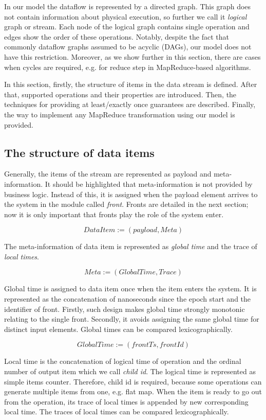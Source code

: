 
\label {fs-model-section}
In our model the dataflow is represented by a directed graph. This graph does not contain information about physical execution, so further we call it {\it logical} graph or stream. Each node of the logical graph contains single operation and edges show the order of these operations. Notably, despite the fact that commonly dataflow graphs assumed to be acyclic (DAGs), our model does not have this restriction. Moreover, as we show further in this section, there are cases when cycles are required, e.g. for reduce step in MapReduce-based algorithms. 

In this section, firstly, the structure of items in the data stream is defined. After that, supported operations and their properties are introduced. Then, the techniques for providing at least/exactly once guarantees are described. Finally, the way to implement any MapReduce transformation using our model is provided.

\subsection{The structure of data items}
Generally, the items of the stream are represented as payload and meta-information. It should be highlighted that meta-information is not provided by business logic. Instead of this, it is assigned when the payload element arrives to the system in the module called {\it front}. Fronts are detailed in the next section; now it is only important that fronts play the role of the system enter. 

\[DataItem := (payload, Meta)\]

The meta-information of data item is represented as {\it global time} and the trace of {\it local times}.

\[Meta := (GlobalTime, Trace)\]

Global time is assigned to data item once when the item enters the system. It is represented as the concatenation of nanoseconds since the epoch start and the identifier of front. Firstly, such design makes global time strongly monotonic relating to the single front. Secondly, it avoids assigning the same global time for distinct input elements. Global times can be compared lexicographically.

\[GlobalTime := (frontTs, frontId)\]

Local time is the concatenation of logical time of operation and the ordinal number of output item which we call {\it child id}. The logical time is represented as simple items counter. Therefore, child id is required, because some operations can generate multiple items from one, e.g. flat map. When the item is ready to go out from the operation, its trace of local times is appended by new corresponding local time. The traces of local times can be compared lexicographically.

